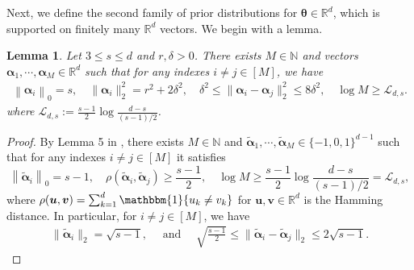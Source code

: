 \documentclass[aos,preprint]{imsart}
\theoremstyle{plain}
\newtheorem{lemma}[theorem]{Lemma}
\theoremstyle{definition}
\newcommand{\btheta}{\boldsymbol{\theta}}
\newcommand{\balpha}{\boldsymbol{\alpha}}
\newcommand{\hbtheta}{\widehat{\boldsymbol{\theta}}}
\newcommand{\idf}{\mathbbm{1}}
\newcommand{\mR}{\mathbb{R}}
\newcommand{\bu}{\boldsymbol{u}}
\newcommand{\bv}{\boldsymbol{v}}
\newcommand{\bR}{\mathbb{R}}
\newcommand{\bN}{\mathbb{N}}
\newcommand{\Exp}{\mathbb{E}}
\begin{document}
\begin{appendix}

Next, we define the second family of prior distributions for $\btheta \in \bR^{d}$, which is supported on finitely many $\bR^{d}$ vectors. We begin with a lemma.

\begin{lemma} \label{lemma: packing set}
Let $3 \leq s \leq d$ and $r,\delta > 0$. There exists $M \in \bN$ and vectors $\balpha_1,\cdots, \balpha_M\in \mR^d$ such that for any indexes $i\neq j \in [M]$, we have 
\begin{equation}\label{eq: sparse V-G}
\begin{aligned}
   \left\|\balpha_i\right\|_0 = s, \quad \|\balpha_i\|_2^2 = r^2+2\delta^2, \quad \delta^2 \le \|\balpha_i-\balpha_j\|_2^2\le 8\delta^2,
    \quad \log M\ge \mathcal{L}_{d,s}.
\end{aligned}
\end{equation}
where $\mathcal{L}_{d,s} := \frac{s-1}{2}\log\frac{d-s}{(s-1)/2}$.
\end{lemma}

\begin{proof} By
Lemma 5 in \cite{raskutti2011minimax},  there exists 
$M \in \bN$ and  $\tilde{\balpha}_1,\cdots, \tilde{\balpha}_M \in \{-1,0,1\}^{d-1}$ such that for any indexes $i\neq j \in [M]$ it satisfies
$$\left\|\tilde{\balpha}_i\right\|_0 = s-1, \quad \rho(\tilde{\balpha}_i, \tilde{\balpha}_j)\ge \frac{s-1}{2}, \quad \log M\ge \frac{s-1}{2}\log\frac{d-s}{(s-1)/2} = \mathcal{L}_{d,s},$$
where $\rho(\bu,\bv) = \sum_{k=1}^d\idf\{u_k\neq v_k\}$ for $\bu,\bv\in\mR^d$ is the Hamming distance. In particular, for $i\neq j \in [M]$, we have
\begin{align*}
\|\tilde{\balpha}_i\|_2 = \sqrt{s-1},\quad \text{ and } \quad
\sqrt{\frac{s-1}{2}}  \le \|\tilde{\balpha}_i-\tilde{\balpha}_j\|_2\le   2\sqrt{s-1}.
\end{align*}


\end{proof}
\end{appendix}
\end{document}
